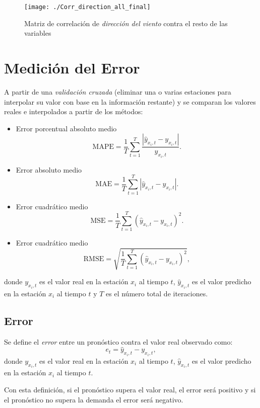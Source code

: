 \begin{figure}[H]
\centering
\texttt{[image: ./Corr\_direction\_all\_final]}
\caption{Matriz de correlación de {\em dirección del viento} contra el resto de las variables}
\label{corrdirection}
\end{figure}






\section{Medición del Error}

A partir de una {\em validación cruzada} (eliminar una o varias estaciones para interpolar su valor con base en la información restante) y se comparan los valores reales e interpolados a partir de los métodos: 

\begin{itemize}
\item Error porcentual absoluto medio
\[ \text{MAPE} = \frac{1}{T} \sum_{t=1}^{T} \frac{|\hat{y}_{x_{i},t} -y_{x_{i},t}|}{y_{x_{i},t}}. \]
\item Error absoluto medio
\[ \text{MAE} = \frac{1}{T} \sum_{t=1}^{T} |\hat{y}_{x_{i},t}-y_{x_{i},t}|. \]
\item Error cuadrático medio
\[ \text{MSE} = \frac{1}{T} \sum_{t=1}^{T} (\hat{y}_{x_{i},t}-y_{x_{i},t})^{2}. \]
\item Error cuadrático medio 
\[ \text{RMSE} = \sqrt{ \frac{1}{T} \sum_{t=1}^{T} (\hat{y}_{x_{i},t}-y_{x_{i},t})^{2}}, \]
\end{itemize}

donde $y_{x_{i},t}$ es el valor real en la estación $x_{i}$ al tiempo $t$, $\hat{y}_{x_{i},t}$ es el valor predicho en la estación $x_{i}$ al tiempo $t$ y $T$ es el número total de iteraciones.

\subsection{Error}
Se define el {\em error} entre un pronóstico contra el valor real observado como:
\[ e_{t} = \hat{y}_{x_{i},t} -y_{x_{i},t}, \]
donde $y_{x_{i},t}$ es el valor real en la estación $x_{i}$ al tiempo $t$, $\hat{y}_{x_{i},t}$ es el valor predicho en la estación $x_{i}$ al tiempo $t$.

Con esta definición, si el pronóstico supera el valor real, el error será positivo y si el pronóstico no supera la demanda el error será negativo. 


